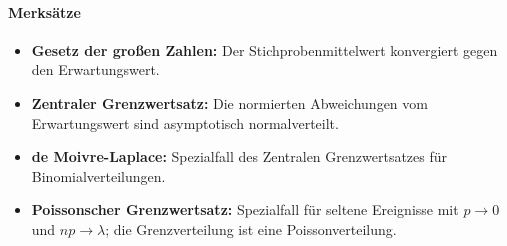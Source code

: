 \paragraph{Merksätze}
\begin{itemize}
    \item \textbf{Gesetz der großen Zahlen:} Der Stichprobenmittelwert konvergiert gegen den Erwartungswert.
    \item \textbf{Zentraler Grenzwertsatz:} Die normierten Abweichungen vom Erwartungswert sind asymptotisch normalverteilt.
    \item \textbf{de Moivre-Laplace:} Spezialfall des Zentralen Grenzwertsatzes für Binomialverteilungen.
    \item \textbf{Poissonscher Grenzwertsatz:} Spezialfall für seltene Ereignisse mit $p\to0$ und $np\to\lambda$; die Grenzverteilung ist eine Poissonverteilung.
\end{itemize}
